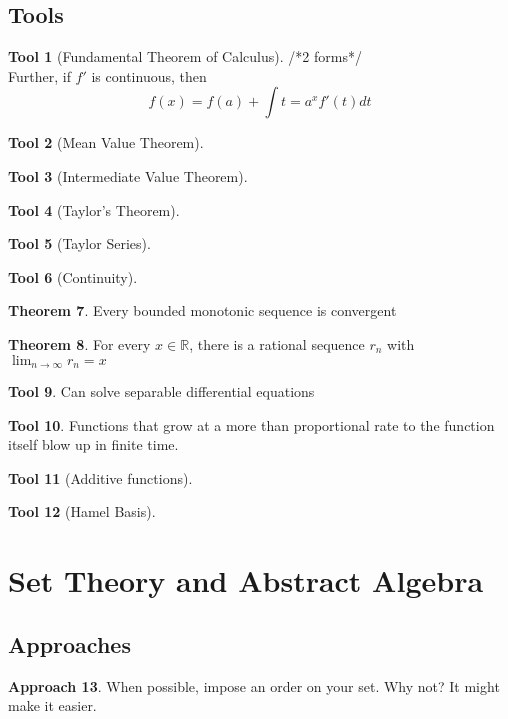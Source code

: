 \documentclass[12pt]{amsart}
\theoremstyle{definition}
\newtheorem{theorem}{Theorem}[section]
\newtheorem{tool}[theorem]{Tool}
\newtheorem{approach}[theorem]{Approach}
\begin{document}
\subsection{Tools}
\begin{tool}[Fundamental Theorem of Calculus]
    /*2 forms*/\\
    Further, if $f'$ is continuous, then
    \begin{equation*}
        f(x) = f(a) + \int{t=a}^x f'(t) dt
    \end{equation*}
\end{tool}
\begin{tool}[Mean Value Theorem]\end{tool}
\begin{tool}[Intermediate Value Theorem]\end{tool}
\begin{tool}[Taylor's Theorem]\end{tool}
\begin{tool}[Taylor Series]\end{tool}
\begin{tool}[Continuity]\end{tool}
\begin{theorem} Every bounded monotonic sequence is convergent\end{theorem}
\begin{theorem} For every $x \in \mathbb{R}$, there is a rational sequence
$r_n$ with $\lim_{n\to\infty} r_n = x$ \end{theorem}
\begin{tool} Can solve separable differential equations \end{tool}
\begin{tool} Functions that grow at a more than proportional rate to the
function itself blow up in finite time. \end{tool}
\begin{tool}[Additive functions] \end{tool}
\begin{tool}[Hamel Basis]\end{tool}

\section{Set Theory and Abstract Algebra}
\subsection{Approaches}
\begin{approach}
    When possible, impose an order on your set. Why not? It might make it
    easier.
\end{approach}
\end{document}
